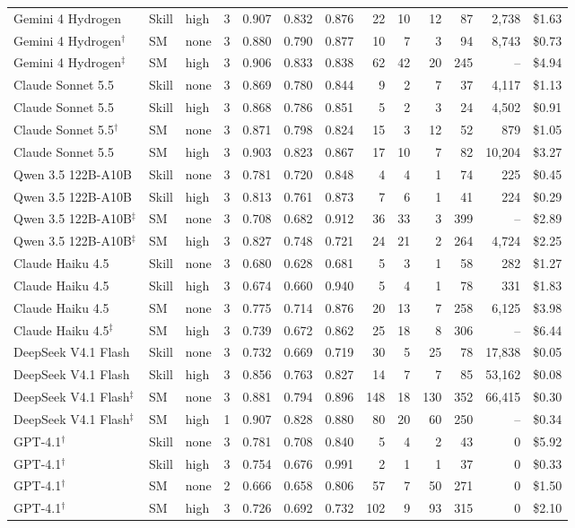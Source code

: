 {\begin{longtable}{@{}l l l r r r r r r r r r r@{}}
Gemini 4 Hydrogen & Skill & high & 3 & 0.907 & 0.832 & 0.876 & 22 & 10 & 12 & 87 & 2{,}738 & \$1.63\\
Gemini 4 Hydrogen$^{\dagger}$ & SM & none & 3 & 0.880 & 0.790 & 0.877 & 10 & 7 & 3 & 94 & 8{,}743 & \$0.73\\
Gemini 4 Hydrogen$^{\ddagger}$ & SM & high & 3 & 0.906 & 0.833 & 0.838 & 62 & 42 & 20 & 245 & -- & \$4.94\\
Claude Sonnet 5.5 & Skill & none & 3 & 0.869 & 0.780 & 0.844 & 9 & 2 & 7 & 37 & 4{,}117 & \$1.13\\
Claude Sonnet 5.5 & Skill & high & 3 & 0.868 & 0.786 & 0.851 & 5 & 2 & 3 & 24 & 4{,}502 & \$0.91\\
Claude Sonnet 5.5$^{\dagger}$ & SM & none & 3 & 0.871 & 0.798 & 0.824 & 15 & 3 & 12 & 52 & 879 & \$1.05\\
Claude Sonnet 5.5 & SM & high & 3 & 0.903 & 0.823 & 0.867 & 17 & 10 & 7 & 82 & 10{,}204 & \$3.27\\
Qwen 3.5 122B-A10B & Skill & none & 3 & 0.781 & 0.720 & 0.848 & 4 & 4 & 1 & 74 & 225 & \$0.45\\
Qwen 3.5 122B-A10B & Skill & high & 3 & 0.813 & 0.761 & 0.873 & 7 & 6 & 1 & 41 & 224 & \$0.29\\
Qwen 3.5 122B-A10B$^{\ddagger}$ & SM & none & 3 & 0.708 & 0.682 & 0.912 & 36 & 33 & 3 & 399 & -- & \$2.89\\
Qwen 3.5 122B-A10B$^{\ddagger}$ & SM & high & 3 & 0.827 & 0.748 & 0.721 & 24 & 21 & 2 & 264 & 4{,}724 & \$2.25\\
Claude Haiku 4.5 & Skill & none & 3 & 0.680 & 0.628 & 0.681 & 5 & 3 & 1 & 58 & 282 & \$1.27\\
Claude Haiku 4.5 & Skill & high & 3 & 0.674 & 0.660 & 0.940 & 5 & 4 & 1 & 78 & 331 & \$1.83\\
Claude Haiku 4.5 & SM & none & 3 & 0.775 & 0.714 & 0.876 & 20 & 13 & 7 & 258 & 6{,}125 & \$3.98\\
Claude Haiku 4.5$^{\ddagger}$ & SM & high & 3 & 0.739 & 0.672 & 0.862 & 25 & 18 & 8 & 306 & -- & \$6.44\\
DeepSeek V4.1 Flash & Skill & none & 3 & 0.732 & 0.669 & 0.719 & 30 & 5 & 25 & 78 & 17{,}838 & \$0.05\\
DeepSeek V4.1 Flash & Skill & high & 3 & 0.856 & 0.763 & 0.827 & 14 & 7 & 7 & 85 & 53{,}162 & \$0.08\\
DeepSeek V4.1 Flash$^{\ddagger}$ & SM & none & 3 & 0.881 & 0.794 & 0.896 & 148 & 18 & 130 & 352 & 66{,}415 & \$0.30\\
DeepSeek V4.1 Flash$^{\ddagger}$ & SM & high & 1 & 0.907 & 0.828 & 0.880 & 80 & 20 & 60 & 250 & -- & \$0.34\\
GPT-4.1$^{\dagger}$ & Skill & none & 3 & 0.781 & 0.708 & 0.840 & 5 & 4 & 2 & 43 & 0 & \$5.92\\
GPT-4.1$^{\dagger}$ & Skill & high & 3 & 0.754 & 0.676 & 0.991 & 2 & 1 & 1 & 37 & 0 & \$0.33\\
GPT-4.1$^{\dagger}$ & SM & none & 2 & 0.666 & 0.658 & 0.806 & 57 & 7 & 50 & 271 & 0 & \$1.50\\
GPT-4.1$^{\dagger}$ & SM & high & 3 & 0.726 & 0.692 & 0.732 & 102 & 9 & 93 & 315 & 0 & \$2.10\\
\bottomrule\end{longtable}}
